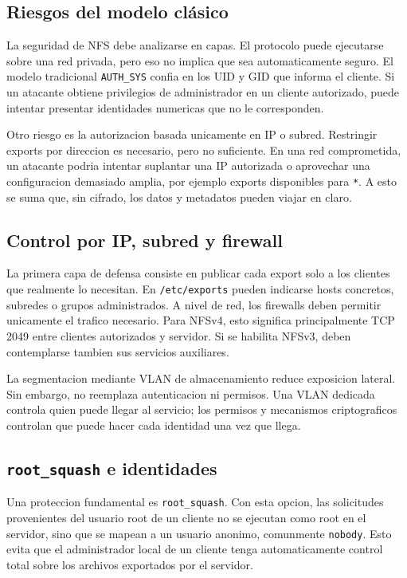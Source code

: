 \subsection{Riesgos del modelo clásico}

La seguridad de NFS debe analizarse en capas. El protocolo puede ejecutarse sobre una red privada, pero eso no implica que sea automaticamente seguro. El modelo tradicional \texttt{AUTH\_SYS} confia en los UID y GID que informa el cliente. Si un atacante obtiene privilegios de administrador en un cliente autorizado, puede intentar presentar identidades numericas que no le corresponden.

Otro riesgo es la autorizacion basada unicamente en IP o subred. Restringir exports por direccion es necesario, pero no suficiente. En una red comprometida, un atacante podria intentar suplantar una IP autorizada o aprovechar una configuracion demasiado amplia, por ejemplo exports disponibles para \texttt{*}. A esto se suma que, sin cifrado, los datos y metadatos pueden viajar en claro.

\subsection{Control por IP, subred y firewall}

La primera capa de defensa consiste en publicar cada export solo a los clientes que realmente lo necesitan. En \texttt{/etc/exports} pueden indicarse hosts concretos, subredes o grupos administrados. A nivel de red, los firewalls deben permitir unicamente el trafico necesario. Para NFSv4, esto significa principalmente TCP 2049 entre clientes autorizados y servidor. Si se habilita NFSv3, deben contemplarse tambien sus servicios auxiliares.

La segmentacion mediante VLAN de almacenamiento reduce exposicion lateral. Sin embargo, no reemplaza autenticacion ni permisos. Una VLAN dedicada controla quien puede llegar al servicio; los permisos y mecanismos criptograficos controlan que puede hacer cada identidad una vez que llega.

\subsection{\texttt{root\_squash} e identidades}

Una proteccion fundamental es \texttt{root\_squash}. Con esta opcion, las solicitudes provenientes del usuario root de un cliente no se ejecutan como root en el servidor, sino que se mapean a un usuario anonimo, comunmente \texttt{nobody}. Esto evita que el administrador local de un cliente tenga automaticamente control total sobre los archivos exportados por el servidor.


